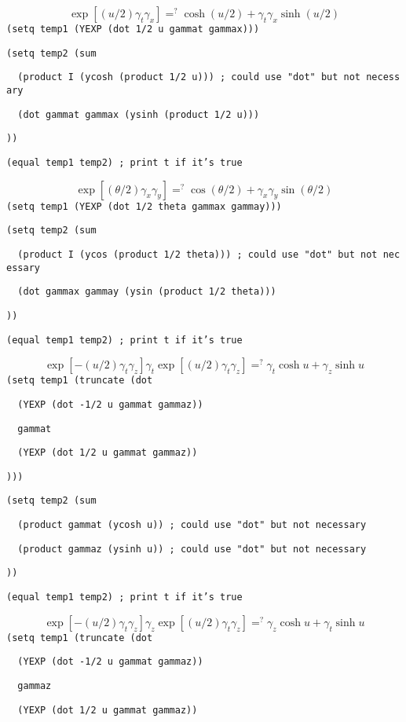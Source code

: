 $$\exp[(u/2)\gamma_t\gamma_x]\mathrel{\mathop=^?}
\cosh(u/2)+\gamma_t\gamma_x\sinh(u/2)$$
{\tt (setq\ temp1\ (YEXP\ (dot\ 1/2\ u\ gammat\ gammax)))}

{\tt (setq\ temp2\ (sum}

{\tt \ \ (product\ I\ (ycosh\ (product\ 1/2\ u)))\ ;\ could\ use\ "dot"\ but\ not\ necessary}

{\tt \ \ (dot\ gammat\ gammax\ (ysinh\ (product\ 1/2\ u)))}

{\tt ))}

{\tt (equal\ temp1\ temp2)\ ;\ print\ t\ if\ it's\ true}

$$\exp[(\theta/2)\gamma_x\gamma_y]\mathrel{\mathop=^?}
\cos(\theta/2)+\gamma_x\gamma_y\sin(\theta/2)$$
{\tt (setq\ temp1\ (YEXP\ (dot\ 1/2\ theta\ gammax\ gammay)))}

{\tt (setq\ temp2\ (sum}

{\tt \ \ (product\ I\ (ycos\ (product\ 1/2\ theta)))\ ;\ could\ use\ "dot"\ but\ not\ necessary}

{\tt \ \ (dot\ gammax\ gammay\ (ysin\ (product\ 1/2\ theta)))}

{\tt ))}

{\tt (equal\ temp1\ temp2)\ ;\ print\ t\ if\ it's\ true}

$$\exp[-(u/2)\gamma_t\gamma_z]\gamma_t
\exp[(u/2)\gamma_t\gamma_z]
\mathrel{\mathop=^?}\gamma_t\cosh u+\gamma_z\sinh u$$
{\tt (setq\ temp1\ (truncate\ (dot}

{\tt \ \ (YEXP\ (dot\ -1/2\ u\ gammat\ gammaz))}

{\tt \ \ gammat}

{\tt \ \ (YEXP\ (dot\ 1/2\ u\ gammat\ gammaz))}

{\tt )))}

{\tt (setq\ temp2\ (sum}

{\tt \ \ (product\ gammat\ (ycosh\ u))\ ;\ could\ use\ "dot"\ but\ not\ necessary}

{\tt \ \ (product\ gammaz\ (ysinh\ u))\ ;\ could\ use\ "dot"\ but\ not\ necessary}

{\tt ))}

{\tt (equal\ temp1\ temp2)\ ;\ print\ t\ if\ it's\ true}

$$\exp[-(u/2)\gamma_t\gamma_z]\gamma_z
\exp[(u/2)\gamma_t\gamma_z]
\mathrel{\mathop=^?}\gamma_z\cosh u+\gamma_t\sinh u$$
{\tt (setq\ temp1\ (truncate\ (dot}

{\tt \ \ (YEXP\ (dot\ -1/2\ u\ gammat\ gammaz))}

{\tt \ \ gammaz}

{\tt \ \ (YEXP\ (dot\ 1/2\ u\ gammat\ gammaz))}

